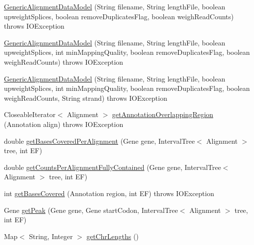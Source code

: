 \begin{DoxyCompactItemize}
\item 
\hyperlink{classbroad_1_1pda_1_1seq_1_1segmentation_1_1_generic_alignment_data_model_a2a80f15f2e55db41c31577789f285d04}{Generic\+Alignment\+Data\+Model} (String filename, String length\+File, boolean upweight\+Splices, boolean remove\+Duplicates\+Flag, boolean weigh\+Read\+Counts)  throws I\+O\+Exception
\item 
\hyperlink{classbroad_1_1pda_1_1seq_1_1segmentation_1_1_generic_alignment_data_model_a9f762cd68e9e3e98fad83a1e3732d5b0}{Generic\+Alignment\+Data\+Model} (String filename, String length\+File, boolean upweight\+Splices, int min\+Mapping\+Quality, boolean remove\+Duplicates\+Flag, boolean weigh\+Read\+Counts)  throws I\+O\+Exception
\item 
\hyperlink{classbroad_1_1pda_1_1seq_1_1segmentation_1_1_generic_alignment_data_model_adac8c2d23887427c364ec8a8bfd27f97}{Generic\+Alignment\+Data\+Model} (String filename, String length\+File, boolean upweight\+Splices, int min\+Mapping\+Quality, boolean remove\+Duplicates\+Flag, boolean weigh\+Read\+Counts, String strand)  throws I\+O\+Exception
\item 
Closeable\+Iterator$<$ Alignment $>$ \hyperlink{classbroad_1_1pda_1_1seq_1_1segmentation_1_1_generic_alignment_data_model_a70112d8fb66b00e90e3e1c537ff152ce}{get\+Annotation\+Overlapping\+Region} (Annotation align)  throws I\+O\+Exception
\item 
double \hyperlink{classbroad_1_1pda_1_1seq_1_1segmentation_1_1_generic_alignment_data_model_a4581ee080760a52c56aa2fec9315367b}{get\+Bases\+Covered\+Per\+Alignment} (Gene gene, Interval\+Tree$<$ Alignment $>$ tree, int E\+F)
\item 
double \hyperlink{classbroad_1_1pda_1_1seq_1_1segmentation_1_1_generic_alignment_data_model_aaaf8aeeaf2f81e37ef6949ecf3cff75f}{get\+Counts\+Per\+Alignment\+Fully\+Contained} (Gene gene, Interval\+Tree$<$ Alignment $>$ tree, int E\+F)
\item 
int \hyperlink{classbroad_1_1pda_1_1seq_1_1segmentation_1_1_generic_alignment_data_model_a103697fa11dcbb0127954861e92cc6a9}{get\+Bases\+Covered} (Annotation region, int E\+F)  throws I\+O\+Exception 
\item 
Gene \hyperlink{classbroad_1_1pda_1_1seq_1_1segmentation_1_1_generic_alignment_data_model_abfcc396fc6a74370074144b1ba648520}{get\+Peak} (Gene gene, Gene start\+Codon, Interval\+Tree$<$ Alignment $>$ tree, int E\+F)
\item 
Map$<$ String, Integer $>$ \hyperlink{classbroad_1_1pda_1_1seq_1_1segmentation_1_1_generic_alignment_data_model_a198d95d9393812ebeba0432f8ca4b840}{get\+Chr\+Lengths} ()

\end{DoxyCompactItemize}
